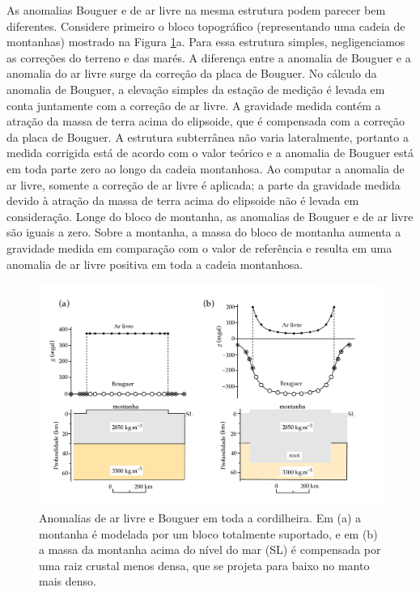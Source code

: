 \documentclass[]{book}
\theoremstyle{definition}
\theoremstyle{definition}
\theoremstyle{definition}
\theoremstyle{remark}
\begin{document}
As anomalias Bouguer e de ar livre na mesma estrutura podem parecer bem diferentes. Considere primeiro o bloco topográfico (representando uma cadeia de montanhas) mostrado na Figura \ref{fig:anomalias}a. Para essa estrutura simples, negligenciamos as correções do terreno e das marés. A diferença entre a anomalia de Bouguer e a anomalia do ar livre surge da correção da placa de Bouguer. No cálculo da anomalia de Bouguer, a elevação simples da estação de medição é levada em conta juntamente com a correção de ar livre. A gravidade medida contém a atração da massa de terra acima do elipsoide, que é compensada com a correção da placa de Bouguer. A estrutura subterrânea não varia lateralmente, portanto a medida corrigida está de acordo com o valor teórico e a anomalia de Bouguer está em toda parte zero ao longo da cadeia montanhosa. Ao computar a anomalia de ar livre, somente a correção de ar livre é aplicada; a parte da gravidade medida devido à atração da massa de terra acima do elipsoide não é levada em consideração. Longe do bloco de montanha, as anomalias de Bouguer e de ar livre são iguais a zero. Sobre a montanha, a massa do bloco de montanha aumenta a gravidade medida em comparação com o valor de referência e resulta em uma anomalia de ar livre positiva em toda a cadeia montanhosa.

\begin{figure}

{\centering \includegraphics[width=0.8\linewidth]{fig/Fig_02.36} 

}

\caption{Anomalias de ar livre e Bouguer em toda a cordilheira. Em (a) a montanha é modelada por um bloco totalmente suportado, e em (b) a massa da montanha acima do nível do mar (SL) é compensada por uma raiz crustal menos densa, que se projeta para baixo no manto mais denso.}\label{fig:anomalias}
\end{figure}
\end{document}
